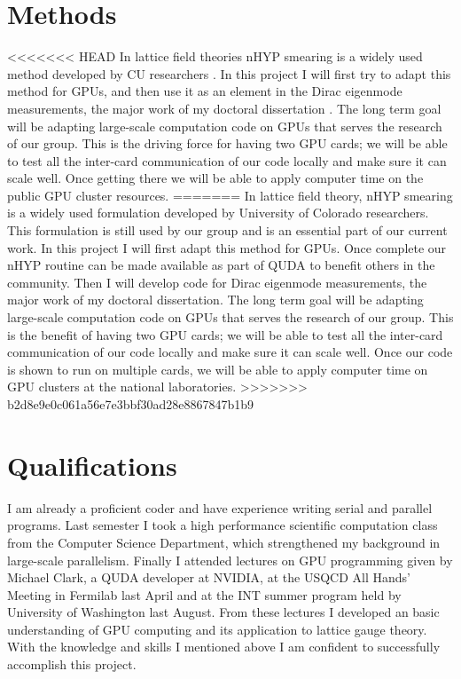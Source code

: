 \documentclass[11pt]{article}
\begin{document}
   \section*{Methods} %
<<<<<<< HEAD
  In lattice field theories nHYP smearing is a widely used method developed by CU researchers \cite{nHYP1,nHYP2,nHYP3}. 
  In this project I will first try to adapt this method for GPUs, and then use it as an element in the Dirac eigenmode measurements, the major work of my doctoral dissertation \cite{paper1, paper2, paper3}. The long term goal will be adapting large-scale computation code on GPUs that serves the research of our group. This is the driving force for having two GPU cards; we will be able to test all the inter-card communication of our code locally and make sure it can scale well. Once getting there we will be able to apply computer time on the public GPU cluster resources. 
=======
  In lattice field theory, nHYP smearing is a widely used formulation developed by University of Colorado researchers. 
  This formulation is still used by our group and is an essential part of our current work.
  In this project I will first adapt this method for GPUs.
  Once complete our nHYP routine can be made available as part of QUDA to benefit others in the community.
  Then I will develop code for Dirac eigenmode measurements, the major work of my doctoral dissertation.
  The long term goal will be adapting large-scale computation code on GPUs that serves the research of our group. 
  This is the benefit of having two GPU cards; we will be able to test all the inter-card communication of our code locally and make sure it can scale well. 
  Once our code is shown to run on multiple cards, we will be able to apply computer time on GPU clusters at the national laboratories. 
>>>>>>> b2d8e9e0c061a56e7e3bbf30ad28e8867847b1b9
    
  \section*{Qualifications} %
  I am already a proficient coder and have experience writing serial and parallel programs.
  Last semester I took a high performance scientific computation class from the Computer Science Department, which strengthened my background in large-scale parallelism.
  Finally I attended lectures on GPU programming given by Michael Clark, a QUDA developer at NVIDIA, at the USQCD All Hands' Meeting in Fermilab last April and at the INT summer program held by University of Washington last August. 
  From these lectures I developed an basic understanding of GPU computing and its application to lattice gauge theory. 
  With the knowledge and skills I mentioned above I am confident to successfully accomplish this project.
  \pagebreak
\end{document}
